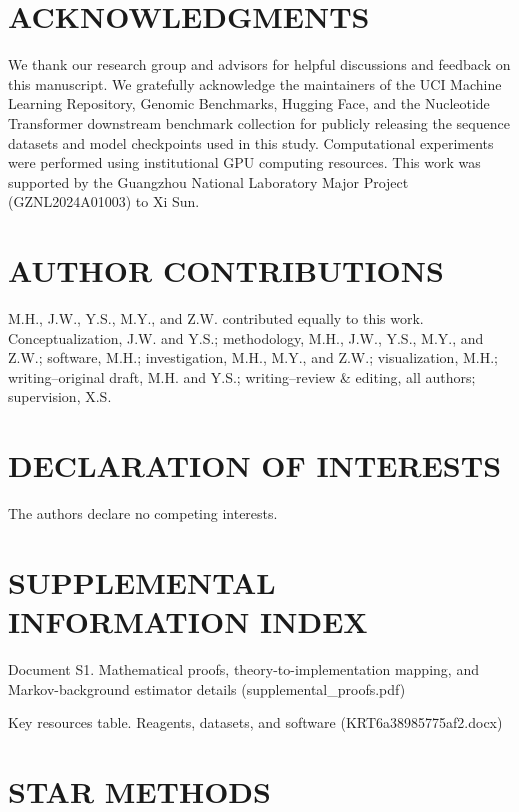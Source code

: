 \documentclass[12pt,letterpaper]{article}
\begin{document}
\section*{ACKNOWLEDGMENTS}
We thank our research group and advisors for helpful discussions and feedback on this manuscript. We gratefully acknowledge the maintainers of the UCI Machine Learning Repository, Genomic Benchmarks, Hugging Face, and the Nucleotide Transformer downstream benchmark collection for publicly releasing the sequence datasets and model checkpoints used in this study. Computational experiments were performed using institutional GPU computing resources. This work was supported by the Guangzhou National Laboratory Major Project (GZNL2024A01003) to Xi Sun.

\section*{AUTHOR CONTRIBUTIONS}
M.H., J.W., Y.S., M.Y., and Z.W. contributed equally to this work. Conceptualization, J.W. and Y.S.; methodology, M.H., J.W., Y.S., M.Y., and Z.W.; software, M.H.; investigation, M.H., M.Y., and Z.W.; visualization, M.H.; writing--original draft, M.H. and Y.S.; writing--review \& editing, all authors; supervision, X.S.

\section*{DECLARATION OF INTERESTS}
The authors declare no competing interests.

\section*{SUPPLEMENTAL INFORMATION INDEX}
\begin{description}
  \item Document S1. Mathematical proofs, theory-to-implementation mapping, and Markov-background estimator details (supplemental\_proofs.pdf)
  \item Key resources table. Reagents, datasets, and software (KRT6a38985775af2.docx)
\end{description}



\newpage

\section*{STAR METHODS}
\end{document}
